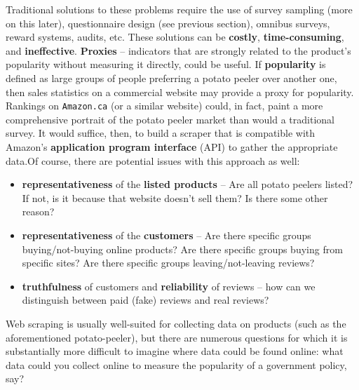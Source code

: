 Traditional solutions to these problems require the use of survey sampling (more on this later), questionnaire design (see previous section), omnibus surveys, reward systems, audits, etc. These solutions can be \textbf{costly}, \textbf{time-consuming}, and \textbf{ineffective}. \newl \textbf{Proxies} -- indicators that are strongly related to the product's popularity without measuring it directly, could be useful. If \textbf{popularity} is defined as large groups of people preferring a potato peeler over another one, then sales statistics on a commercial website may provide a proxy for popularity. 
\newl Rankings on \texttt{Amazon.ca} (or a similar website) could, in fact, paint a more comprehensive portrait of the potato peeler market than would a traditional survey. It would suffice, then, to build a scraper that is compatible with Amazon's \textbf{application program interface} (API) to gather the appropriate data.\newl Of course, there are potential issues with this approach as well: 
\begin{itemize}[noitemsep]
\item \textbf{representativeness} of the \textbf{listed products} -- Are all potato peelers listed? If not, is it because that website doesn't sell them? Is there some other reason?

\item \textbf{representativeness} of the \textbf{customers} -- Are there specific groups buying/not-buying online products? Are there specific groups buying from specific sites? Are there specific groups leaving/not-leaving reviews? 

\item \textbf{truthfulness} of customers and \textbf{reliability} of reviews -- how can we distinguish between paid (fake) reviews and real reviews?
\end{itemize}
Web scraping is usually well-suited for collecting data on products (such as the aforementioned potato-peeler), but there are numerous questions for which it is substantially more difficult to imagine where data could be found online: what data could you collect online to measure the popularity of a government policy, say? 
